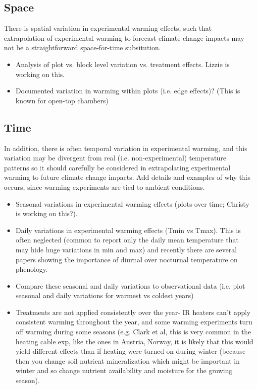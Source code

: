 \documentclass{article}
\begin{document}
\subsection {Space}
There is spatial variation in experimental warming effects, such that extrapolation of experimental warming to forecast climate change impacts may not be a straightforward space-for-time subsitution.%
\begin{itemize}
\item Analysis of plot vs. block level variation vs. treatment effects. Lizzie is working on this.
\item Documented variation in warming within plots (i.e. edge effects)? (This is known for open-top chambers)
\end{itemize}
\subsection {Time}
In addition, there is often temporal variation in experimental warming, and this variation may be divergent from real (i.e. non-experimental) temperature patterns so it should carefully be considered in extrapolating experimental warming to future climate change impacts. Add details and examples of why this occurs, since warming experiments are tied to ambient conditions. 
\begin{itemize}
\item Seasonal variations in experimental warming effects (plots over time; Christy is working on this?).
\item Daily variations in experimental warming effects (Tmin vs Tmax). This is often neglected (common to report only the daily mean temperature that may hide huge variations in min and max) and recently there are several papers showing the importance of diurnal over nocturnal temperature on phenology.
\item Compare these seasonal and daily variations to observational data (i.e. plot seasonal and daily variations for warmest vs coldest years)
\item Treatments are not applied consistently over the year- IR heaters can't
apply consistent warming throughout the year, and some warming experiments turn off warming during some seasons (e.g. Clark et al, this is very common in the heating cable exp, like the ones in Austria, Norway, it is likely that this would yield different effects than if heating were turned on during winter (because then you change soil nutrient mineralization which might be important in winter and so change nutrient availability and moisture for the growing season). 
\end{itemize}
\end{document}
